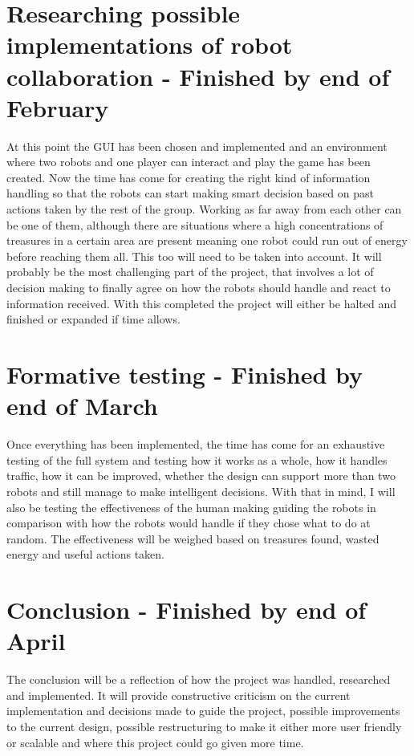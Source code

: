 \documentclass{report}
\begin{document}
  	\section{Researching possible implementations of robot collaboration - Finished by end of February} 

  	At this point the GUI has been chosen and implemented and an environment where two robots and one player can interact and play the game has been created. Now the time has come for creating the right kind of information handling so that the robots can start making smart decision based on past actions taken by the rest of the group. Working as far away from each other can be one of them, although there are situations where a high concentrations of treasures in a certain area are present meaning one robot could run out of energy before reaching them all. This too will need to be taken into account. It will probably be the most challenging part of the project, that involves a lot of decision making to finally agree on how the robots should handle and react to information received. With this completed the project will either be halted and finished or expanded if time allows.

  	\section{Formative testing - Finished by end of March}

  	Once everything has been implemented, the time has come for an exhaustive testing of the full system and testing how it works as a whole, how it handles traffic, how it can be improved, whether the design can support more than two robots and still manage to make intelligent decisions. With that in mind, I will also be testing the effectiveness of the human making guiding the robots in comparison with how the robots would handle if they chose what to do at random. The effectiveness will be weighed based on treasures found, wasted energy and useful actions taken.

  	\section{Conclusion - Finished by end of April}

  	The conclusion will be a reflection of how the project was handled, researched and implemented. It will provide constructive criticism on the current implementation and decisions made to guide the project, possible improvements to the current design, possible restructuring to make it either more user friendly or scalable and where this project could go given more time.
\end{document}
